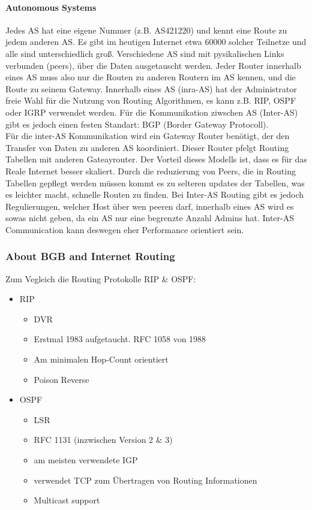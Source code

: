 		\paragraph{Autonomous Systems}
			Jedes AS hat eine eigene Nummer (z.B. AS421220) und kennt eine Route zu jedem anderen AS. Es gibt im heutigen Internet etwa 60000 solcher Teilnetze und alle sind unterschiedlich groß. Verschiedene AS sind mit pysikalischen Links verbunden (peers), über die Daten ausgetauscht werden. Jeder Router innerhalb eines AS muss also nur die Routen zu anderen Routern im AS kennen, und die Route zu seinem Gateway. Innerhalb eines AS (inra-AS) hat der Administrator freie Wahl für die Nutzung von Routing Algorithmen, es kann z.B. RIP, OSPF oder IGRP verwendet werden. Für die Kommunikation ziwschen AS (Inter-AS) gibt es jedoch einen festen Standart: BGP (Border Gateway Protocoll). \\
			Für die inter-AS Kommunikation wird ein Gateway Router benötigt, der den Transfer von Daten zu anderen AS koordiniert. Dieser Router pfelgt Routing Tabellen mit anderen Gateayrouter. Der Vorteil dieses Modells ist, dass es für das Reale Internet besser skaliert. Durch die reduzierung von Peers, die in Routing Tabellen gepflegt werden müssen kommt es zu selteren updates der Tabellen, was es leichter macht, schnelle Routen zu finden. Bei Inter-AS Routing gibt es jedoch Regulierungen, welcher Host über wen peeren darf, innerhalb eines AS wird es sowas nicht geben, da ein AS nur eine begrenzte Anzahl Admins hat. Inter-AS Communication kann deswegen eher Performance orientiert sein. 

		\subsubsection{About BGB and Internet Routing}
			Zum Vegleich die Routing Protokolle RIP \& OSPF:
			\begin{itemize}
				\item RIP
				\begin{itemize}
					\item DVR
					\item Erstmal 1983 aufgetaucht. RFC 1058 von 1988
					\item Am minimalen Hop-Count orientiert
					\item Poison Reverse
				\end{itemize}
				\item OSPF
				\begin{itemize}
					\item LSR
					\item RFC 1131 (inzwischen Version 2 \& 3)
					\item am meisten verwendete IGP 
					\item verwendet TCP zum Übertragen von Routing Informationen
					\item Multicast support
				\end{itemize}
			\end{itemize}

